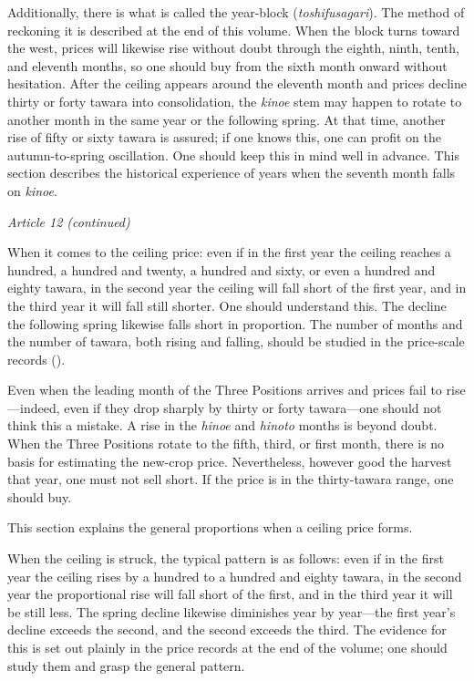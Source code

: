 Additionally, there is what is called the year-block
(\textit{toshifusagari}). The method of reckoning it is described at the
end of this volume. When the block turns toward the west, prices will
likewise rise without doubt through the eighth, ninth, tenth, and
eleventh months, so one should buy from the sixth month onward without
hesitation. After the ceiling appears around the eleventh month and
prices decline thirty or forty tawara into consolidation, the
\textit{kinoe} stem may happen to rotate to another month in the same
year or the following spring. At that time, another rise of fifty or
sixty tawara is assured; if one knows this, one can profit on the
autumn-to-spring oscillation. One should keep this in mind well in
advance. This section describes the historical experience of years when
the seventh month falls on \textit{kinoe}.

\begin{sokyubox}
{\small\itshape\color{sokyubar} Article 12 (continued)}

\medskip
When it comes to the ceiling price: even if in the first year the
ceiling reaches a hundred, a hundred and twenty, a hundred and sixty, or
even a hundred and eighty tawara, in the second year the ceiling will
fall short of the first year, and in the third year it will fall still
shorter. One should understand this. The decline the following spring
likewise falls short in proportion. The number of months and the number
of tawara, both rising and falling, should be studied in the price-scale
records ().

Even when the leading month of the Three Positions arrives and prices
fail to rise---indeed, even if they drop sharply by thirty or forty
tawara---one should not think this a mistake. A rise in the
\textit{hinoe} and \textit{hinoto} months is beyond doubt. When the
Three Positions rotate to the fifth, third, or first month, there is no
basis for estimating the new-crop price. Nevertheless, however good the
harvest that year, one must not sell short. If the price is in the
thirty-tawara range, one should buy.
\end{sokyubox}

\commentary
This section explains the general proportions when a ceiling price forms.

When the ceiling is struck, the typical pattern is as follows: even if in
the first year the ceiling rises by a hundred to a hundred and eighty
tawara, in the second year the proportional rise will fall short of the
first, and in the third year it will be still less. The spring decline
likewise diminishes year by year---the first year's decline exceeds the
second, and the second exceeds the third. The evidence for this is set
out plainly in the price records at the end of the volume; one should
study them and grasp the general pattern.

